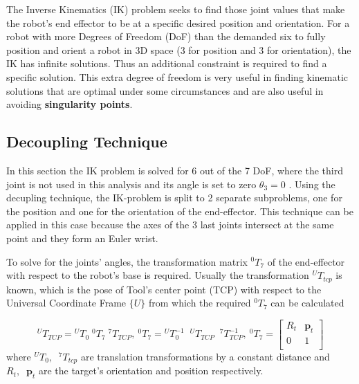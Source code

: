 The Inverse Kinematics (IK) problem seeks to find those joint values that make the robot's end effector to be at a specific desired position and orientation. For a robot with more Degrees of Freedom (DoF) than the demanded six to fully position and orient a robot in 3D space (3 for position and 3 for orientation), the IK has infinite solutions. Thus an additional constraint is required to find a specific solution. This extra degree of freedom is very useful in finding kinematic solutions that are optimal under some circumstances and are also useful in avoiding \textbf{singularity points}.

\subsection{Decoupling Technique}

In this section the IK problem is solved for 6 out of the 7 DoF, where the third joint is not used in this analysis and its angle is set to zero $θ_3 = 0$ . Using the decupling technique, the IK-problem is split to 2 separate subproblems, one for the position and one for the orientation of the end-effector. This technique can be applied in this case because the axes of the 3 last joints intersect at the same point and they form an Euler wrist. 

To solve for the joints' angles, the transformation matrix $^0T_7$ of the end-effector with respect to the robot's base is required. Usually the transformation ${}^UT_{tcp}$ is known, which is the pose of Tool's center point (TCP) with respect to the Universal Coordinate Frame $\lbrace U \rbrace$ from which the required $^0T_7$ can be calculated

\begin{equation}
{}^UT_{TCP} = {}^UT_0  \;  {}^0T_7  \;   {}^7T_{TCP}
,
~
{}^0T_7 = {}^UT_0^{-1}  \;\;  {}^UT_{TCP}  \;\;  {}^7T_{TCP}^{-1}
,
~
{}^0T_7 = \begin{bmatrix}
R_t & \mathbf{p}_t \\
0 & 1 \\
\end{bmatrix}
\end{equation}
%
where ${}^UT_0,  \;\;   {}^7T_{tcp}$ are translation transformations by a constant distance and $R_t,  \;\; \mathbf{p}_t$ are the target's orientation 
and position respectively.

